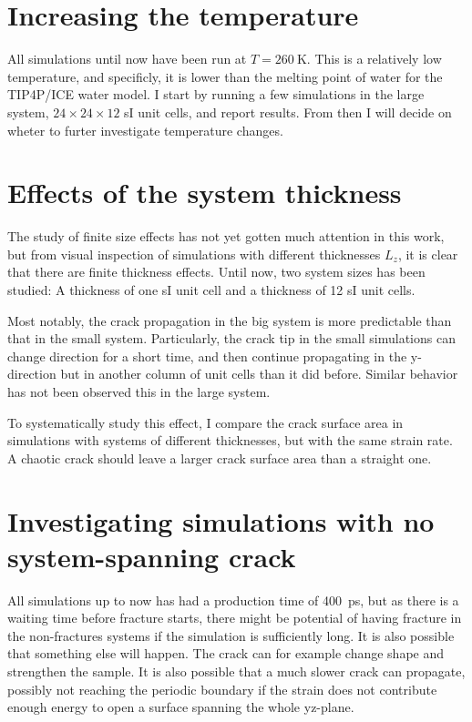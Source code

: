 \section{Increasing the temperature}
All simulations until now have been run at $T=\SI{260}{\kelvin}$. This is a relatively low temperature, and specificly, it is lower than the melting point of water for the TIP4P/ICE water model. I start by running a few simulations in the large system, $24\times 24\times 12$ sI unit cells, and report results. From then I will decide on wheter to furter investigate temperature changes.



\section{Effects of the system thickness}
The study of finite size effects has not yet gotten much attention in this work, but from visual inspection of simulations with different thicknesses $L_z$, it is clear that there are finite thickness effects. Until now, two system sizes has been studied: A thickness of one sI unit cell and a thickness of 12 sI unit cells. 

Most notably, the crack propagation in the big system is more predictable than that in the small system. Particularly, the crack tip in the small simulations can change direction for a short time, and then continue propagating in the y-direction but in another column of unit cells than it did before. Similar behavior has not been observed this in the large system.


To systematically study this effect, I compare the crack surface area in simulations with systems of different thicknesses, but with the same strain rate. A chaotic crack should leave a larger crack surface area than a straight one.

\section{Investigating simulations with no system-spanning crack}
All simulations up to now has had a production time of \SI{400}{\pico\second}, but as there is a waiting time before fracture starts, there might be potential of having fracture in the non-fractures systems if the simulation is sufficiently long. It is also possible that something else will happen. The crack can for example change shape and strengthen the sample. It is also possible that a much slower crack can propagate, possibly not reaching the periodic boundary if the strain does not contribute enough energy to open a surface spanning the whole yz-plane. 

